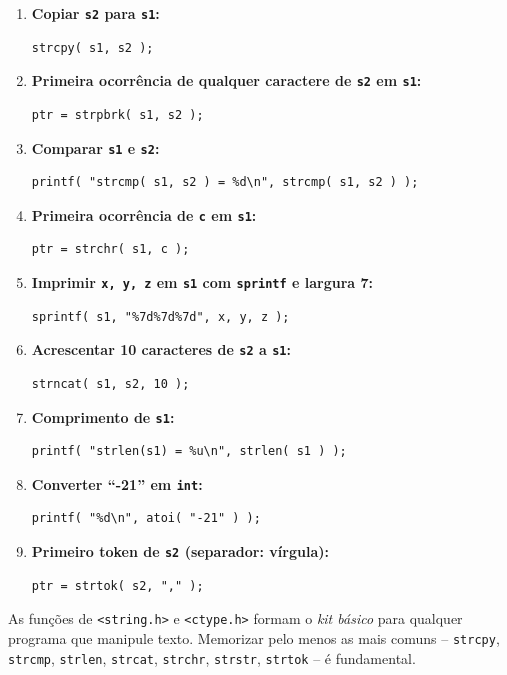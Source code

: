 \documentclass[12pt,a4paper]{article}
\begin{document}
\begin{respostabox}
\begin{enumerate}[label=\textbf{\alph*)}]
\item \textbf{Copiar \texttt{s2} para \texttt{s1}:}
\begin{lstlisting}
strcpy( s1, s2 );
\end{lstlisting}

\item \textbf{Primeira ocorrência de qualquer caractere de \texttt{s2} em \texttt{s1}:}
\begin{lstlisting}
ptr = strpbrk( s1, s2 );
\end{lstlisting}

\item \textbf{Comparar \texttt{s1} e \texttt{s2}:}
\begin{lstlisting}
printf( "strcmp( s1, s2 ) = %d\n", strcmp( s1, s2 ) );
\end{lstlisting}

\item \textbf{Primeira ocorrência de \texttt{c} em \texttt{s1}:}
\begin{lstlisting}
ptr = strchr( s1, c );
\end{lstlisting}

\item \textbf{Imprimir \texttt{x, y, z} em \texttt{s1} com \texttt{sprintf} e largura 7:}
\begin{lstlisting}
sprintf( s1, "%7d%7d%7d", x, y, z );
\end{lstlisting}

\item \textbf{Acrescentar 10 caracteres de \texttt{s2} a \texttt{s1}:}
\begin{lstlisting}
strncat( s1, s2, 10 );
\end{lstlisting}

\item \textbf{Comprimento de \texttt{s1}:}
\begin{lstlisting}
printf( "strlen(s1) = %u\n", strlen( s1 ) );
\end{lstlisting}

\item \textbf{Converter ``-21'' em \texttt{int}:}
\begin{lstlisting}
printf( "%d\n", atoi( "-21" ) );
\end{lstlisting}

\item \textbf{Primeiro token de \texttt{s2} (separador: vírgula):}
\begin{lstlisting}
ptr = strtok( s2, "," );
\end{lstlisting}

\end{enumerate}

\begin{boaprática}
  As funções de \texttt{<string.h>} e \texttt{<ctype.h>} formam o \textit{kit
  básico} para qualquer programa que manipule texto. Memorizar pelo menos as
  mais comuns -- \texttt{strcpy}, \texttt{strcmp}, \texttt{strlen}, \texttt{strcat},
  \texttt{strchr}, \texttt{strstr}, \texttt{strtok} -- é fundamental.
\end{boaprática}
\end{respostabox}
\end{document}
